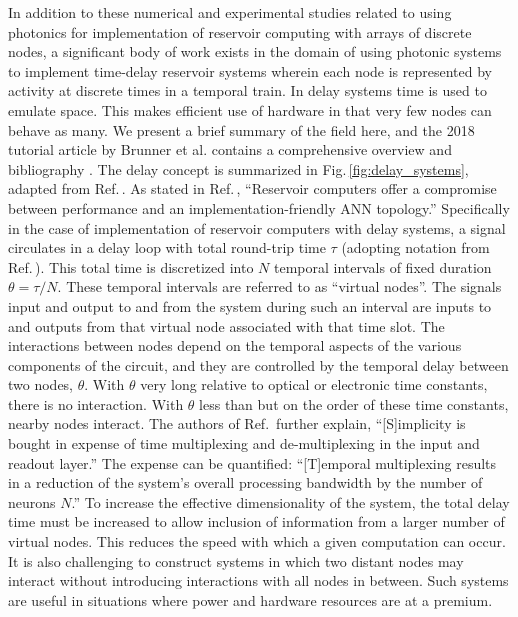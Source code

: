 In addition to these numerical and experimental studies related to using photonics for implementation of reservoir computing with arrays of discrete nodes, a significant body of work exists in the domain of using photonic systems to implement time-delay reservoir systems wherein each node is represented by activity at discrete times in a temporal train. In delay systems time is used to emulate space. This makes efficient use of hardware in that very few nodes can behave as many. We present a brief summary of the field here, and the 2018 tutorial article by Brunner et al. contains a comprehensive overview and bibliography \cite{brpe2018}. The delay concept is summarized in Fig.\,\ref{fig:delay_systems}, adapted from Ref.\,\cite{apso2011}. As stated in Ref.\,\cite{brpe2018}, ``Reservoir computers offer a compromise between performance and an implementation-friendly ANN topology.'' Specifically in the case of implementation of reservoir computers with delay systems, a signal circulates in a delay loop with total round-trip time $\tau$ (adopting notation from Ref.\,\cite{apso2011}). This total time is discretized into $N$ temporal intervals of fixed duration $\theta = \tau/N$. These temporal intervals are referred to as ``virtual nodes''. The signals input and output to and from the system during such an interval are inputs to and outputs from that virtual node associated with that time slot. The interactions between nodes depend on the temporal aspects of the various components of the circuit, and they are controlled by the temporal delay between two nodes, $\theta$. With $\theta$ very long relative to optical or electronic time constants, there is no interaction. With $\theta$ less than but on the order of these time constants, nearby nodes interact. The authors of Ref.\, further explain, ``[S]implicity is bought in expense of time multiplexing and de-multiplexing in the input and readout layer.'' The expense can be quantified: ``[T]emporal multiplexing results in a reduction of the system's overall processing bandwidth by the number of neurons $N$.'' To increase the effective dimensionality of the system, the total delay time must be increased to allow inclusion of information from a larger number of virtual nodes. This reduces the speed with which a given computation can occur. It is also challenging to construct systems in which two distant nodes may interact without introducing interactions with all nodes in between. Such systems are useful in situations where power and hardware resources are at a premium.

